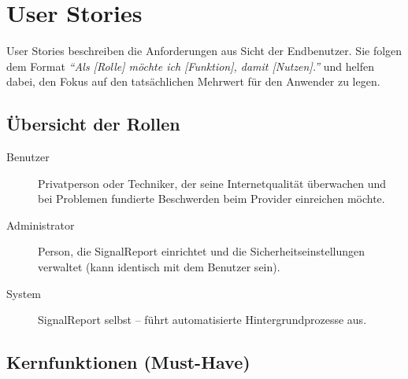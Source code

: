 \section{User Stories}
\label{sec:userstories}

User Stories beschreiben die Anforderungen aus Sicht der Endbenutzer. Sie folgen dem Format
\textit{``Als [Rolle] möchte ich [Funktion], damit [Nutzen].''} und helfen dabei, den Fokus
auf den tatsächlichen Mehrwert für den Anwender zu legen.

\subsection{Übersicht der Rollen}

\begin{description}
  \item[Benutzer] Privatperson oder Techniker, der seine Internetqualität überwachen
    und bei Problemen fundierte Beschwerden beim Provider einreichen möchte.
  \item[Administrator] Person, die SignalReport einrichtet und die Sicherheitseinstellungen
    verwaltet (kann identisch mit dem Benutzer sein).
  \item[System] SignalReport selbst -- führt automatisierte Hintergrundprozesse aus.
\end{description}

\subsection{Kernfunktionen (Must-Have)}

